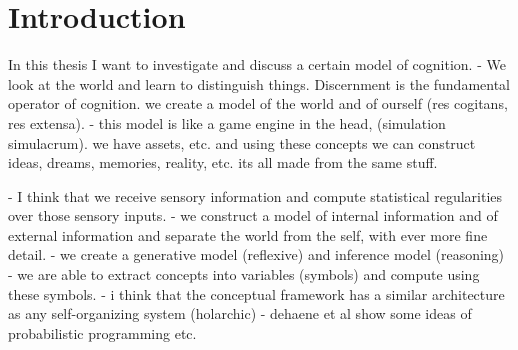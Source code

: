 \section{Introduction}

In this thesis I want to investigate and discuss a certain model of cognition.
- We look at the world and learn to distinguish things. Discernment is the fundamental operator of cognition.
we create a model of the world and of ourself (res cogitans, res extensa).
- this model is like a game engine in the head, (simulation simulacrum). we have assets, etc. and using these concepts we can construct ideas, dreams, memories, reality, etc. its all made from the same stuff.



- I think that we receive sensory information and compute statistical regularities over those sensory inputs. 
- we construct a model of internal information and of external information and separate the world from the self, with ever more fine detail. - we create a generative model (reflexive) and inference model (reasoning)
- we are able to extract concepts into variables (symbols) and compute using these symbols.
- i think that the conceptual framework has a similar architecture as any self-organizing system (holarchic)
- dehaene et al show some ideas of probabilistic programming etc. 










